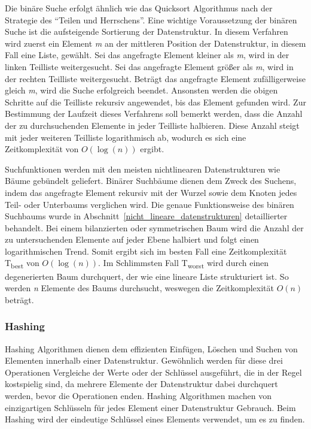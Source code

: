 Die binäre Suche erfolgt ähnlich wie das Quicksort Algorithmus nach der Strategie des \enquote{Teilen und Herrschens}. Eine wichtige Voraussetzung der binären Suche ist die aufsteigende Sortierung der Datenstruktur. In diesem Verfahren wird zuerst ein Element \textit{m} an der mittleren Position der Datenstruktur, in diesem Fall eine Liste, gewählt. Sei das angefragte Element kleiner als \textit{m}, wird in der linken Teilliste weitergesucht. Sei das angefragte Element größer als \textit{m}, wird in der rechten Teilliste weitergesucht. Beträgt das angefragte Element zufälligerweise gleich \textit{m}, wird die Suche erfolgreich beendet. Ansonsten werden die obigen Schritte auf die Teilliste rekursiv angewendet, bis das Element gefunden wird. Zur Bestimmung der Laufzeit dieses Verfahrens soll bemerkt werden, dass die Anzahl der zu durchsuchenden Elemente in jeder Teilliste halbieren. Diese Anzahl steigt mit jeder weiteren Teilliste logarithmisch ab, wodurch es sich eine Zeitkomplexität von $O(\log(n))$ ergibt. \autocite[224-226]{hubwieser_fundamente_2015}

Suchfunktionen werden mit den meisten nichtlinearen Datenstrukturen wie Bäume gebündelt geliefert. Binärer Suchbäume dienen dem Zweck des Suchens, indem das angefragte Element rekursiv mit der Wurzel sowie dem Knoten jedes Teil- oder Unterbaums verglichen wird. Die genaue Funktionsweise des binären Suchbaums wurde in Abschnitt~\ref{nicht_lineare_datenstrukturen} detaillierter behandelt. Bei einem bilanzierten oder symmetrischen Baum wird die Anzahl der zu untersuchenden Elemente auf jeder Ebene halbiert und folgt einen logarithmischen Trend. Somit ergibt sich im besten Fall eine Zeitkomplexität T\textsubscript{best} von $O(\log(n))$. Im Schlimmsten Fall T\textsubscript{worst} wird durch einen degenerierten Baum durchquert, der wie eine lineare Liste strukturiert ist. So werden \textit{n} Elemente des Baums durchsucht, weswegen die Zeitkomplexität $O(n)$ beträgt. \autocite[226-228]{hubwieser_fundamente_2015}

\subsubsection{Hashing}

Hashing Algorithmen dienen dem effizienten Einfügen, Löschen und Suchen von Elementen innerhalb einer Datenstruktur. Gewöhnlich werden für diese drei Operationen Vergleiche der Werte oder der Schlüssel ausgeführt, die in der Regel kostspielig sind, da mehrere Elemente der Datenstruktur dabei durchquert werden, bevor die Operationen enden. Hashing Algorithmen machen von einzigartigen Schlüsseln für jedes Element einer Datenstruktur Gebrauch. Beim Hashing wird der eindeutige Schlüssel eines Elements verwendet, um es zu finden. \autocite[229]{hubwieser_fundamente_2015}

